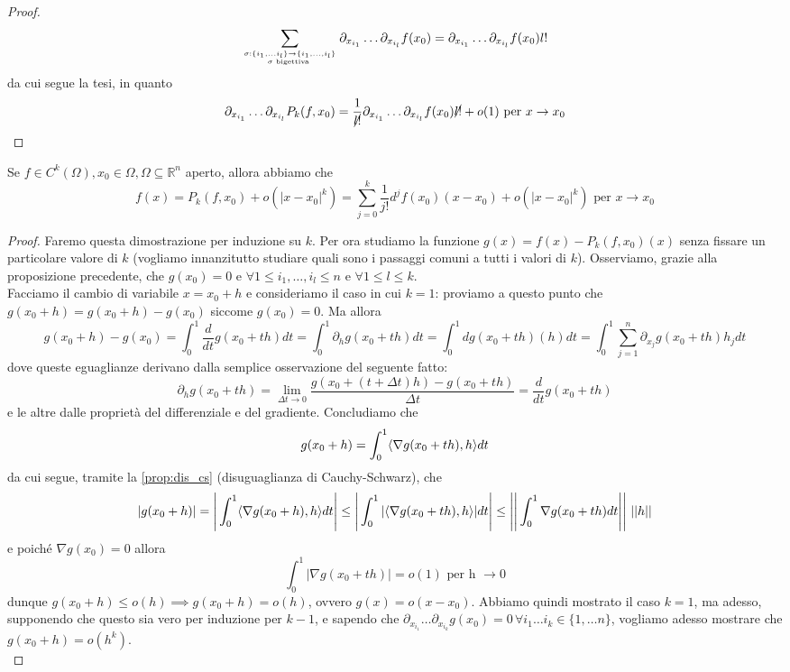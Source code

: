 \documentclass[openany, italian]{book}
\begin{document}
\begin{proof}
$$
\sum_{\sigma: \{i_1, \ldots i_l \} \to \{ i_1, \ldots, i_l \} \atop \sigma \text{ bigettiva }} \partial_{x_{i_1}} \ldots \partial_{x_{i_l}} f(x_0) = \partial_{x_{i_1}} \ldots \partial_{x_{i_l}} f(x_0) l!
$$
da cui segue la tesi, in quanto
$$
\partial_{x_{i_1}} \ldots \partial_{x_{i_l}} P_k(f, x_0) = \frac{1}{\cancel{l!}} \partial_{x_{i_1}} \ldots \partial_{x_{i_l}} f(x_0) \cancel{l!} + o(1) \text{ per } x \to x_0
$$
\end{proof}
\begin{theorem}
Se $f \in C^k ( \Omega ), x_0 \in \Omega, \Omega \subseteq \mathbb{R}^n$ aperto, allora abbiamo che
$$
f(x) = P_k(f, x_0) + o(|x-x_0|^k) = \sum_{j=0}^k \frac{1}{j!} d^j f(x_0)(x-x_0) + o(|x-x_0|^k) \text{ per } x \to x_0
$$
\label{thm:form_taylor}
\end{theorem}
\begin{proof}
Faremo questa dimostrazione per induzione su $k$. Per ora studiamo la funzione $g(x)=f(x)-P_k(f, x_0)(x)$ senza fissare un particolare valore di $k$ (vogliamo innanzitutto studiare quali sono i passaggi comuni a tutti i valori di $k$). Osserviamo, grazie alla proposizione precedente, che $g(x_0) = 0$ e $\forall 1 \leq i_1, \ldots, i_l \leq n$ e $\forall 1 \leq l \leq k$. \\
Facciamo il cambio di variabile $x = x_0 + h$ e consideriamo il caso in cui $k=1$: proviamo a questo punto che $g(x_0+h) = g(x_0 + h) - g(x_0)$ siccome $g(x_0) = 0$. Ma allora
$$
g(x_0 + h) - g(x_0) = \int_0^1 \frac{d}{dt} g(x_0 + th)dt = \int_0^1 \partial_h g(x_0 + th)dt = \int_0^1 dg(x_0 + th)(h)dt = \int_0^1 \sum_{j=1}^n \partial_{x_j} g(x_0 + th) h_j dt
$$
dove queste eguaglianze derivano dalla semplice osservazione del seguente fatto:
$$
\partial_h g(x_0 + th) = \lim_{\Delta t \to 0} \frac{g(x_0 + (t+\Delta t)h) - g(x_0 + th)}{\Delta t} = \frac{d}{dt} g(x_0 + th)
$$
e le altre dalle proprietà del differenziale e del gradiente. Concludiamo che
$$
g(x_0 + h) = \int_{0}^1 \langle \nabla g(x_0 + th), h \rangle dt
$$
da cui segue, tramite la \ref{prop:dis_cs} (disuguaglianza di Cauchy-Schwarz), che 
$$
|g(x_0 + h)| = \Bigg| \int_{0}^1 \langle \nabla g(x_0 + h), h \rangle dt  \Bigg| \leq \Bigg| \int_{0}^{1} | \langle \nabla g(x_0+th), h \rangle|dt \Bigg| \leq \Bigg| \Bigg| \int_0^1 \nabla g(x_0 + th) dt \Bigg| \Bigg| \, \, || h ||
$$
e poiché $\nabla g(x_0) = 0$ allora
$$
\int_0^1 |\nabla g(x_0 + th)| = o(1) \, \, \text{per h } \to 0
$$
dunque $g(x_0 + h) \leq o(h) \implies g(x_0 + h) = o(h)$, ovvero $g(x)=o(x-x_0)$. Abbiamo quindi mostrato il caso $k=1$, ma adesso, supponendo che questo sia vero per induzione per $k-1$, e sapendo che $\partial_{x_{i_1}} \ldots \partial_{x_{i_k}} g(x_0) = 0 \, \forall i_1 \ldots i_k \in \{1, \ldots n \}$, vogliamo adesso mostrare che $g(x_0 + h) = o(h^{k})$. \\

\end{proof}
\end{document}
